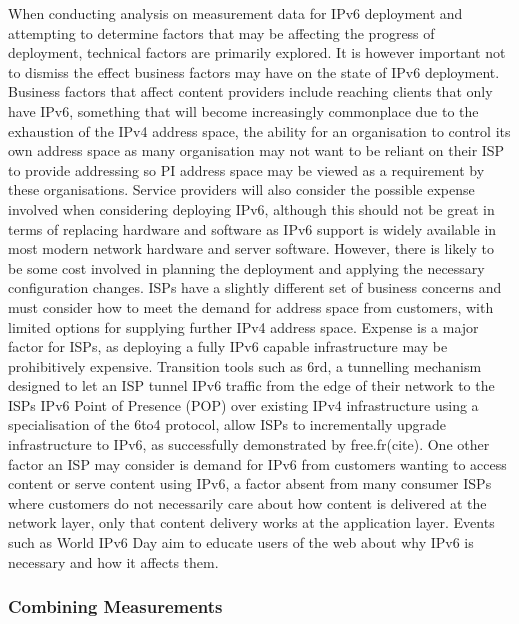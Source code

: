 When conducting analysis on measurement data for IPv6 deployment and attempting
to determine factors that may be affecting the progress of deployment, technical
factors are primarily explored. It is however important not to dismiss the
effect business factors may have on the state of IPv6 deployment. Business
factors that affect content providers include reaching clients that only have
IPv6, something that will become increasingly commonplace due to the exhaustion
of the IPv4 address space, the ability for an organisation to control its own
address space as many organisation may not want to be reliant on their ISP to
provide addressing so PI address space may be viewed as a requirement by these
organisations. Service providers will also consider the possible expense
involved when considering deploying IPv6, although this should not be great in
terms of replacing hardware and software as IPv6 support is widely available in
most modern network hardware and server software. However, there is likely to be
some cost involved in planning the deployment and applying the necessary
configuration changes. ISPs have a slightly different set of business concerns
and must consider how to meet the demand for address space from customers, with
limited options for supplying further IPv4 address space. Expense is a major
factor for ISPs, as deploying a fully IPv6 capable infrastructure may be
prohibitively expensive. Transition tools such as 6rd, a tunnelling mechanism
designed to let an ISP tunnel IPv6 traffic from the edge of their network to the
ISPs IPv6 Point of Presence (POP) over existing IPv4 infrastructure using a
specialisation of the 6to4 protocol, allow ISPs to incrementally upgrade
infrastructure to IPv6, as successfully demonstrated by free.fr(cite). One other
factor an ISP may consider is demand for IPv6 from customers wanting to access
content or serve content using IPv6, a factor absent from many consumer ISPs
where customers do not necessarily care about how content is delivered at the
network layer, only that content delivery works at the application layer. Events
such as World IPv6 Day aim to educate users of the web about why IPv6 is
necessary and how it affects them.

\subsubsection{Combining Measurements}





